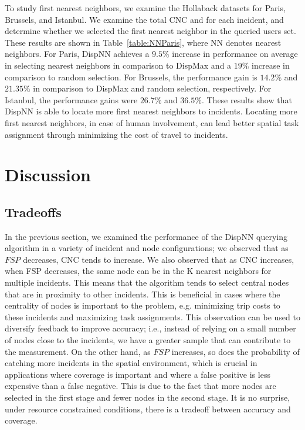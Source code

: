 \documentclass{acm_proc_article-sp}
\begin{document}
To study first nearest neighbors, we examine the Hollaback datasets for Paris, Brussels, and Istanbul. We examine the total CNC and for each incident, and determine whether we selected the first nearest neighbor in the queried users set. These results are shown in Table~\ref{table:NNParis}, where NN denotes nearest neighbors. For Paris, DispNN achieves a $9.5\%$ increase in performance on average in selecting nearest neighbors in comparison to DispMax and a $19\%$ increase in comparison to random selection. For Brussels, the performance gain is $14.2\%$ and $21.35\%$ in comparison to DispMax and random selection, respectively. For Istanbul, the performance gains were $26.7\%$ and $36.5\%$. These results show that DispNN is able to locate more first nearest neighbors to incidents. Locating more first nearest neighbors, in case of human involvement, can lead better spatial task assignment through minimizing the cost of travel to incidents. 
\section{Discussion} \label{discussion}
\subsection{Tradeoffs}
In the previous section, we examined the performance of the DispNN querying algorithm in a variety of incident and node configurations; we observed that as $FSP$ decreases, CNC tends to increase. We also observed that as CNC increases, when FSP decreases, the same node can be in the K nearest neighbors for multiple incidents. This means that the algorithm tends to select central nodes that are in proximity to other incidents. This is beneficial in cases where the centrality of nodes is important to the problem, e.g. minimizing trip costs to these incidents and maximizing task assignments. This observation can be used to diversify feedback to improve accuracy; i.e., instead of relying on a small number of nodes close to the incidents, we have a greater sample that can contribute to the measurement.
On the other hand, as $FSP$ increases, so does the probability of catching more incidents in the spatial environment, which is crucial in applications where coverage is important and where a false positive is less expensive than a false negative. This is due to the fact that more nodes are selected in the first stage and fewer nodes in the second stage. It is no surprise, under resource constrained conditions, there is a tradeoff between accuracy and coverage.
\end{document}

